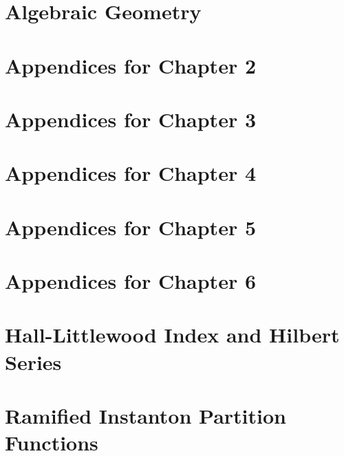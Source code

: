 \documentclass[a4paper,11pt]{book}
\begin{document}
	\chapter{Algebraic Geometry}
	\label{Chap:AppAlgGeo}
	

	\chapter{Appendices for Chapter 2}\label{App:Chap2}
	
	
	\chapter{Appendices for Chapter 3}
	
	
	\chapter{Appendices for Chapter 4}
	
	
	\chapter{Appendices for Chapter 5}
	

	\chapter{Appendices for Chapter 6}\label{App:Chap6}
	
	
	\chapter{Hall-Littlewood Index and Hilbert Series}
	\label{Chap:HLvsHSGenus1}
	
	
	\chapter{Ramified Instanton Partition Functions}
	\label{Chap:AppRamInsts}
		
	
	
\clearpage
\singlespacing



\singlespacing

	
\end{document}
